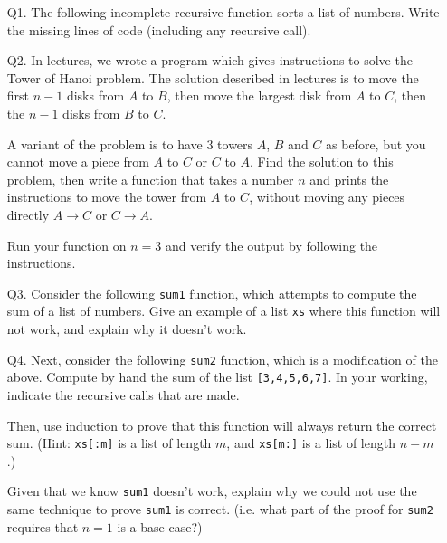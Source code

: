 \documentclass[a4paper,11pt]{article}
\begin{document}
\pagestyle{myheadings}

\begin{enumerate}
\item[Q1.]
The following incomplete recursive function sorts a list of numbers. Write the
missing lines of code (including any recursive call).



\item[Q2.]
In lectures, we wrote a program which gives instructions to solve the Tower
of Hanoi problem.
The solution described in lectures is to move the first $n-1$ disks from $A$ to
$B$, then move the largest disk from $A$ to $C$, then the $n-1$ disks from $B$
to $C$.

A variant of the problem is to have 3 towers $A$, $B$ and $C$
as before, but you cannot move a piece from $A$ to $C$ or $C$ to $A$.
Find the solution to this problem, then
write a function that takes a number $n$ and prints the instructions to move
the tower from $A$ to $C$, without moving any pieces directly $A \to C$ or
$C \to A$.

Run your function on $n=3$ and verify the output by following the instructions.

\item[Q3.]
Consider the following {\tt sum1} function, which attempts to compute the sum
of a list of numbers. Give an example of a list {\tt xs} where this function
will not work, and explain why it doesn't work.



\item[Q4.]
Next, consider the following {\tt sum2} function, which is a modification of the
above.
Compute by hand the sum of the list {\tt [3,4,5,6,7]}. In your working,
indicate the recursive calls that are made.

Then, use induction to prove that this function will always return the correct sum.
(Hint: {\tt xs[:m]} is a list of length $m$, and {\tt xs[m:]} is a list of length $n-m$.)

Given that we know {\tt sum1} doesn't work, explain why
we could not use the same technique to prove {\tt sum1} is correct.
(i.e. what part of the proof for {\tt sum2} requires that $n=1$ is a base case?)



\end{enumerate}

\newpage
\end{document}
